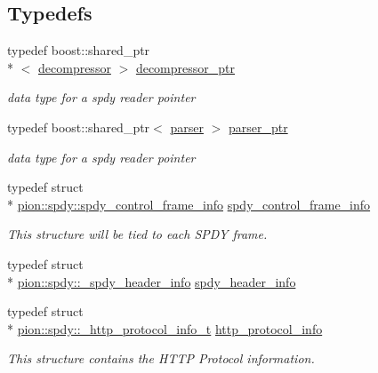\subsection*{Typedefs}
\begin{DoxyCompactItemize}
\item 
typedef boost\-::shared\-\_\-ptr\\*
$<$ \hyperlink{classpion_1_1spdy_1_1decompressor}{decompressor} $>$ \hyperlink{namespacepion_1_1spdy_ac8512dffc9267ba133bd2c560f07fd1e}{decompressor\-\_\-ptr}
\begin{DoxyCompactList}\small\item\em data type for a spdy reader pointer \end{DoxyCompactList}\item 
typedef boost\-::shared\-\_\-ptr$<$ \hyperlink{classpion_1_1spdy_1_1parser}{parser} $>$ \hyperlink{namespacepion_1_1spdy_aa2cb51d7f3735315fbac9c5823b6b5da}{parser\-\_\-ptr}
\begin{DoxyCompactList}\small\item\em data type for a spdy reader pointer \end{DoxyCompactList}\item 
typedef struct \\*
\hyperlink{structpion_1_1spdy_1_1spdy__control__frame__info}{pion\-::spdy\-::spdy\-\_\-control\-\_\-frame\-\_\-info} \hyperlink{namespacepion_1_1spdy_af27b192d1db7a013f86914a93c5e1904}{spdy\-\_\-control\-\_\-frame\-\_\-info}
\begin{DoxyCompactList}\small\item\em This structure will be tied to each S\-P\-D\-Y frame. \end{DoxyCompactList}\item 
typedef struct \\*
\hyperlink{structpion_1_1spdy_1_1__spdy__header__info}{pion\-::spdy\-::\-\_\-spdy\-\_\-header\-\_\-info} \hyperlink{namespacepion_1_1spdy_a74229af785f47c8b3f3d29822086603a}{spdy\-\_\-header\-\_\-info}
\item 
typedef struct \\*
\hyperlink{structpion_1_1spdy_1_1__http__protocol__info__t}{pion\-::spdy\-::\-\_\-http\-\_\-protocol\-\_\-info\-\_\-t} \hyperlink{namespacepion_1_1spdy_a5263e12cb89d30893e41f7b595cae89a}{http\-\_\-protocol\-\_\-info}
\begin{DoxyCompactList}\small\item\em This structure contains the H\-T\-T\-P Protocol information. \end{DoxyCompactList}\end{DoxyCompactItemize}
